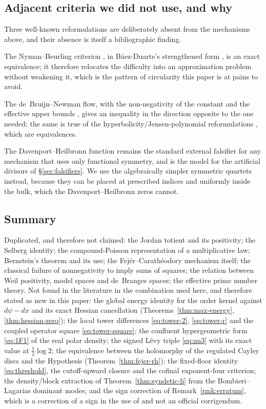 \documentclass[11pt]{amsart}
\theoremstyle{definition}
\theoremstyle{remark}
\theoremstyle{definition}
\begin{document}
\subsection{Adjacent criteria we did not use, and why}

Three well-known reformulations are deliberately absent from the mechanisms above, and their absence
is itself a bibliographic finding.

The Nyman--Beurling criterion \cite{Beurling}, in B\'aez-Duarte's strengthened form
\cite{BaezDuarte}, is an exact equivalence; it therefore relocates the difficulty into an
approximation problem without weakening it, which is the pattern of circularity this paper is at
pains to avoid.

The de~Bruijn--Newman flow, with the non-negativity of the constant \cite{RodgersTao} and the
effective upper bounds \cite{PolymathDBN}, gives an inequality in the direction opposite to the one
needed; the same is true of the hyperbolicity/Jensen-polynomial reformulations
\cite{GORZ}, which are equivalences.

The Davenport--Heilbronn function \cite{DavenportHeilbronn} remains the standard external falsifier
for any mechanism that uses only functional symmetry, and is the model for the artificial divisors
of \S\ref{sec:falsifiers}. We use the algebraically simpler symmetric quartets instead, because
they can be placed at prescribed indices and uniformly inside the bulk, which the
Davenport--Heilbronn zeros cannot.

\subsection{Summary}

Duplicated, and therefore not claimed: the Jordan totient and its positivity; the Selberg identity;
the compound-Poisson representation of a multiplicative law; Bernstein's theorem and its use; the
Fej\'er--Carath\'eodory mechanism itself; the classical failure of nonnegativity to imply sums of
squares; the relation between Weil positivity, model spaces and de~Branges spaces; the effective
prime number theory. Not found in the literature in the combination used here, and therefore stated
as new in this paper: the global energy identity for the order kernel against $d\psi-dx$ and its
exact Hessian cancellation (Theorems~\ref{thm:max-energy}, \ref{thm:hessian-zero}); the local tower
differences \eqref{eq:tower-2}, \eqref{eq:tower-r} and the coupled operator square
\eqref{eq:tower-square}; the confluent hypergeometric form \eqref{eq:1F1} of the real polar
density; the signed L\'evy triple \eqref{eq:nu3} with its exact value at $\tfrac12\log2$; the
equivalence between the holomorphy of the regulated Cayley discs and the Hypothesis
(Theorem~\ref{thm:fejer-rh}); the fixed-floor identity \eqref{eq:threshold}, the cutoff-upward
closure and the cofinal exponent-four criterion; the density/block extraction of
Theorem~\ref{thm:syndetic-li} from the Bombieri--Lagarias dominant modes; and the sign correction
of Remark~\ref{rmk:erratum}, which is a correction of a sign in the use of \cite{Lagarias2007} and not an
official corrigendum.
\end{document}
